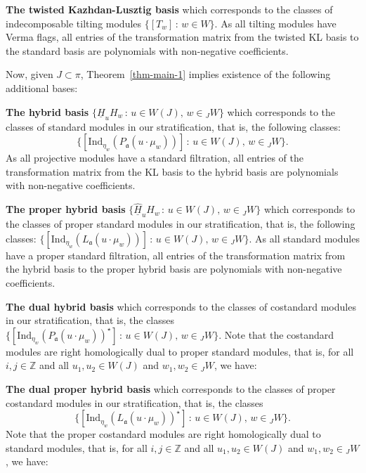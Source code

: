 \documentclass[a4paper]{amsart}
\begin{document}
{\bf The twisted Kazhdan-Lusztig  basis} which corresponds
to the classes of indecomposable tilting modules $\{[T_w]\,:\,w\in W\}$.
As all tilting modules have Verma flags, all entries of the transformation 
matrix from the twisted KL basis to the standard basis are polynomials
with non-negative coefficients.


Now, given $J\subset \pi$, Theorem~\ref{thm-main-1} implies existence
of the following additional bases:

{\bf The hybrid basis} $\{\underline{H}_uH_w\,:\,u\in W(J),\,w\in {}_JW\}$
which corresponds to the classes of standard modules in our
stratification, that is, the following classes:
\begin{displaymath}
\{[\mathrm{Ind}_{\eta_w}
(P_\mathfrak{a}(u\cdot \mu_w))]\,:\, u\in W(J),\,w\in {}_JW\}.
\end{displaymath}
As all projective modules have a standard filtration,
all entries of the transformation  matrix from the KL basis to 
the hybrid basis are polynomials with non-negative coefficients.

{\bf The proper hybrid basis} 
$\{\underline{\hat{H}}_uH_w\,:\,u\in W(J),\,w\in {}_JW\}$
which corresponds to the classes of proper standard modules in our
stratification, that is, the following classes:
$\{[\mathrm{Ind}_{\eta_w}
(L_\mathfrak{a}(u\cdot \mu_w))]\,:\, u\in W(J),\,w\in {}_JW\}$.
As all standard modules have a proper standard filtration,
all entries of the transformation  matrix from the hybrid basis to 
the proper hybrid basis are polynomials with non-negative coefficients.

{\bf The dual hybrid basis} which corresponds to the classes
of costandard modules in our stratification, that is, the
classes $\{[\mathrm{Ind}_{\eta_w}
(P_\mathfrak{a}(u\cdot \mu_w))^\star]\,:\, u\in W(J),\,w\in {}_JW\}$.
Note that the costandard modules are right homologically dual to 
proper standard modules,
that is, for all $i,j\in\mathbb{Z}$ and all $u_1,u_2\in W(J)$
and $w_1,w_2\in {}_JW$, we have:


{\bf The dual proper hybrid basis} which corresponds to the classes
of proper costandard modules in our stratification, that is, 
the classes 
\begin{displaymath}
\{[\mathrm{Ind}_{\eta_w}
(L_\mathfrak{a}(u\cdot \mu_w))^\star]\,:\, u\in W(J),\,w\in {}_JW\}. 
\end{displaymath}
Note that the proper costandard modules are right homologically dual to 
standard modules, that is, for all $i,j\in\mathbb{Z}$ and all 
$u_1,u_2\in W(J)$ and $w_1,w_2\in {}_JW$, we have:
\end{document}
